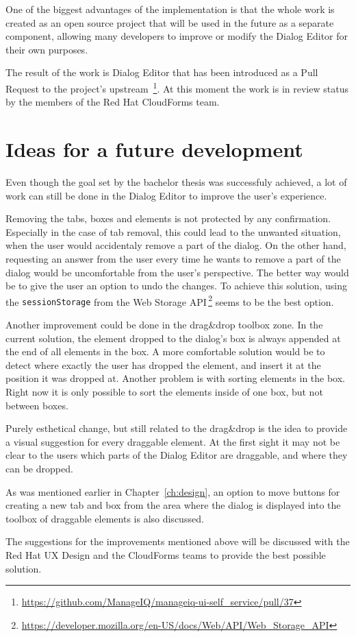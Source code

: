 One of the biggest advantages of the implementation is that the whole work is
created as an open source project that will be used in the future as a separate
component, allowing many developers to improve or modify the Dialog Editor for
their own purposes.

The result of the work is Dialog Editor that has been introduced as a Pull
Request to the project's
upstream~\footnote{\url{https://github.com/ManageIQ/manageiq-ui-self_service/pull/37}}.
At this moment the work is in review status by the members of the Red Hat
CloudForms team.

\section{Ideas for a future development}

Even though the goal set by the bachelor thesis was successfuly achieved,
a lot of work can still be done in the Dialog Editor to improve the user's
experience.

Removing the tabs, boxes and elements is not protected by any confirmation.
Especially in the case of tab removal, this could lead to the unwanted
situation, when the user would accidentaly remove a part of the dialog.
On the other hand, requesting an answer from the user every time he wants to
remove a part of the dialog would be uncomfortable from the user's perspective.
The better way would be to give the user an option to undo the changes.
To achieve this solution, using the {\tt sessionStorage} from
the Web Storage API\,\footnote{\url{https://developer.mozilla.org/en-US/docs/Web/API/Web_Storage_API}}
seems to be the best option.

Another improvement could be done in the drag\&drop toolbox zone.
In the current solution, the element dropped to the dialog's box is always
appended at the end of all elements in the box.
A more comfortable solution would be to detect where exactly the user has
dropped the element, and insert it at the position it was dropped at.
Another problem is with sorting elements in the box. Right now it is only
possible to sort the elements inside of one box, but not between boxes.

Purely esthetical change, but still related to the drag\&drop is the idea to
provide a visual suggestion for every draggable element. At the first sight it
may not be clear to the users which parts of the Dialog Editor are draggable,
and where they can be dropped.

As was mentioned earlier in Chapter~\ref{ch:design}, an
option to move buttons for creating a new tab and box from the area where the
dialog is displayed into the toolbox of draggable elements is also discussed.

The suggestions for the improvements mentioned above will be discussed with
the Red Hat UX Design and the CloudForms teams to provide the best possible
solution.
